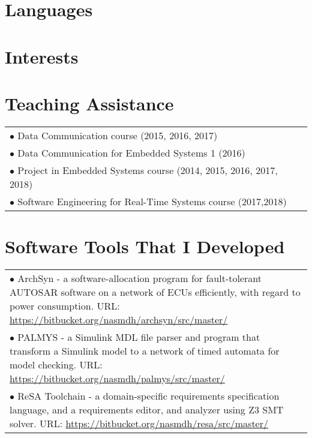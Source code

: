 \documentclass[11pt,a4paper,sans]{moderncv} %
\begin{document}
\begin{minipage}[t]{.5\textwidth}


\section{Languages}
\raggedright
{}
\end{minipage}%
\begin{minipage}[t]{.5\textwidth}

\section{Interests}
\raggedleft
{}
\end{minipage}

\section{Teaching Assistance}
\begin{tabular}{@{}p{1\linewidth}@{}}
$\bullet$ Data Communication course (2015, 2016, 2017)\\[6pt]
$\bullet$ Data Communication for Embedded Systems 1 (2016)\\[6pt]
$\bullet$ Project in Embedded Systems course (2014, 2015, 2016, 2017, 2018)\\[6pt]
$\bullet$ Software Engineering for Real-Time Systems course (2017,2018)%
\end{tabular}

\section{Software Tools That I Developed}
\begin{tabular}{@{}p{1\linewidth}@{}}
$\bullet$ ArchSyn - a software-allocation program for fault-tolerant AUTOSAR software on a network of ECUs efficiently, with regard to power consumption. URL: \url{https://bitbucket.org/nasmdh/archsyn/src/master/}\\[6pt]
$\bullet$ PALMYS - a Simulink MDL file parser and program that transform a Simulink model to a network of timed automata for model checking. URL: \url{https://bitbucket.org/nasmdh/palmys/src/master/}\\[6pt]
$\bullet$ ReSA Toolchain - a domain-specific requirements specification language, and a requirements editor, and analyzer using Z3 SMT solver. URL: \url{https://bitbucket.org/nasmdh/resa/src/master/}
\end{tabular}
\end{document}
